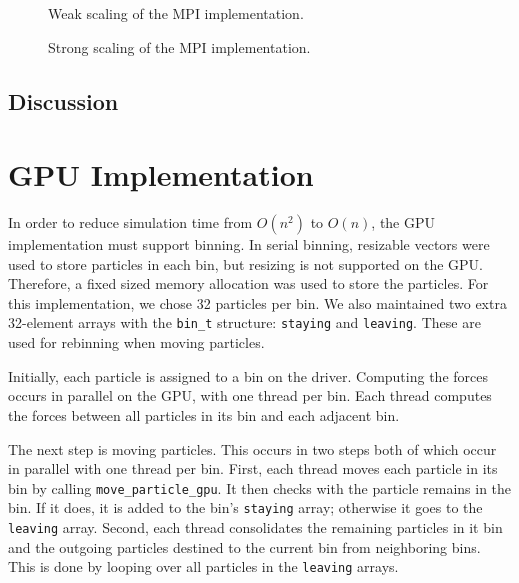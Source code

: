 \documentclass[12pt]{article}
\begin{document}
\begin{figure}
  \caption{Weak scaling of the MPI implementation.}
  \label{fig:mpi-weak}
\end{figure}

\begin{figure}
  \caption{Strong scaling of the MPI implementation.}
  \label{fig:mpi-strong}
\end{figure}

\subsection{Discussion}





\section{GPU Implementation} \label{GPU}

In order to reduce simulation time from $O(n^2)$ to $O(n)$, the GPU implementation must support binning. In serial binning, resizable vectors were used to store particles in each bin, but resizing is not supported on the GPU. Therefore, a fixed sized memory allocation was used to store the particles. For this implementation, we chose 32 particles per bin. We also maintained two extra 32-element arrays with the \texttt{bin\_t} structure: \texttt{staying} and \texttt{leaving}. These are used for rebinning when moving particles.

Initially, each particle is assigned to a bin on the driver. Computing the forces occurs in parallel on the GPU, with one thread per bin. Each thread computes the forces between all particles in its bin and each adjacent bin.

The next step is moving particles. This occurs in two steps both of which occur in parallel with one thread per bin. First, each thread moves each particle in its bin by calling \texttt{move\_particle\_gpu}. It then checks with the particle remains in the bin. If it does, it is added to the bin's \texttt{staying} array; otherwise it goes to the \texttt{leaving} array. Second, each thread consolidates the remaining particles in it bin and the outgoing particles destined to the current bin from neighboring bins. This is done by looping over all particles in the \texttt{leaving} arrays.
\end{document}

